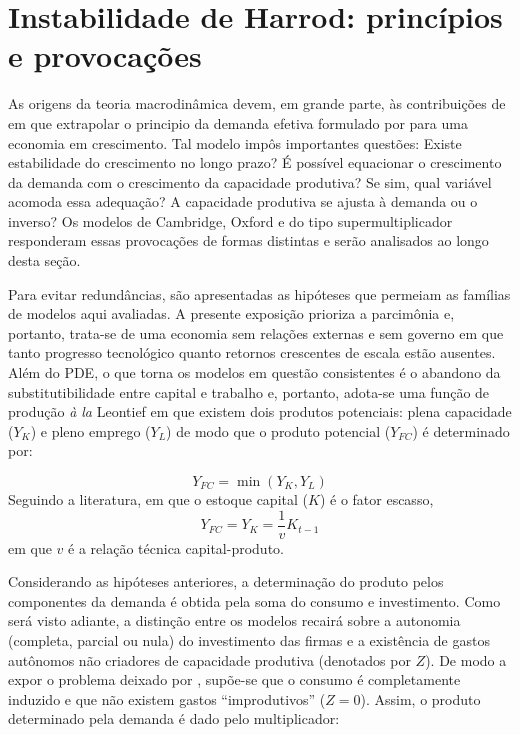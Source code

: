 
\section{Instabilidade de Harrod: princípios e provocações}\label{SecHarrod}


As origens da teoria macrodinâmica devem, em grande parte, às contribuições de \textcite{harrod_essay_1939} em que extrapolar o principio da demanda efetiva formulado por \textcite{keynes_general_1936} para uma economia em crescimento. Tal modelo impôs importantes questões: Existe estabilidade do crescimento no longo pra\-zo? É possível equacionar o crescimento da demanda com o crescimento da capacidade produtiva? Se sim, qual variável acomoda essa adequação? A capacidade produtiva se ajusta à demanda ou o inverso? Os modelos de Cambridge, Oxford e do tipo supermultiplicador responderam essas provocações de formas distintas e serão analisados ao longo desta seção.

Para evitar redundâncias, são apresentadas as hipóteses que permeiam as famílias de modelos aqui avaliadas. 
A presente exposição prioriza a parcimônia e, portanto, trata-se de uma economia sem relações externas e sem governo em que tanto progresso tecnológico quanto retornos crescentes de escala estão ausentes. Além do PDE, o que torna os modelos em questão consistentes é o abandono da substitutibilidade entre capital e trabalho e, portanto, adota-se uma função de produção \textit{à la} Leontief em que existem dois produtos potenciais: plena capacidade ($Y_K$) e pleno emprego ($Y_L$) de modo que o produto potencial ($Y_{FC}$) é determinado por:

\begin{equation}
    Y_{FC} = \min (Y_K, Y_L)
\end{equation}
Seguindo a literatura, em que o estoque capital ($K$) é o fator escasso,
\begin{equation}
\label{Oferta}
    Y_{FC} = Y_K = \frac{1}{v}K_{t-1}
\end{equation}
em que $v$ é a relação técnica capital-produto. 


Considerando as hipóteses anteriores, a determinação do produto pelos componentes da demanda é obtida pela soma do consumo e investimento. Como será visto adiante, a distinção entre os modelos recairá sobre a autonomia (completa, parcial ou nula) do investimento das firmas e a existência de gastos autônomos não criadores de capacidade produtiva (denotados por $Z$). De modo a expor o problema deixado por \textcite{harrod_essay_1939}, supõe-se que o consumo é completamente induzido e que não existem gastos ``improdutivos'' ($Z=0$). Assim, o produto determinado pela demanda é dado pelo multiplicador:

